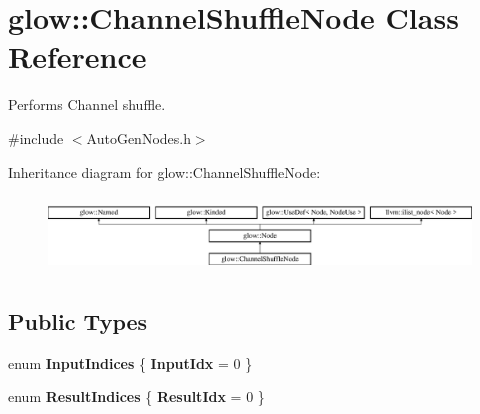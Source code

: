 \hypertarget{classglow_1_1_channel_shuffle_node}{}\section{glow\+:\+:Channel\+Shuffle\+Node Class Reference}
\label{classglow_1_1_channel_shuffle_node}


Performs Channel shuffle.  




{\ttfamily \#include $<$Auto\+Gen\+Nodes.\+h$>$}

Inheritance diagram for glow\+:\+:Channel\+Shuffle\+Node\+:\begin{figure}[H]
\begin{center}
\leavevmode
\includegraphics[height=2.028986cm]{classglow_1_1_channel_shuffle_node}
\end{center}
\end{figure}
\subsection*{Public Types}
\begin{DoxyCompactItemize}
\item 
\mbox{\label{classglow_1_1_channel_shuffle_node_a9e15bf0080072c0619cee1bca4853557}} 
enum {\bfseries Input\+Indices} \{ {\bfseries Input\+Idx} = 0
 \}
\item 
\mbox{\label{classglow_1_1_channel_shuffle_node_a0699b34aed7be5f564816bade6652712}} 
enum {\bfseries Result\+Indices} \{ {\bfseries Result\+Idx} = 0
 \}
\end{DoxyCompactItemize}
